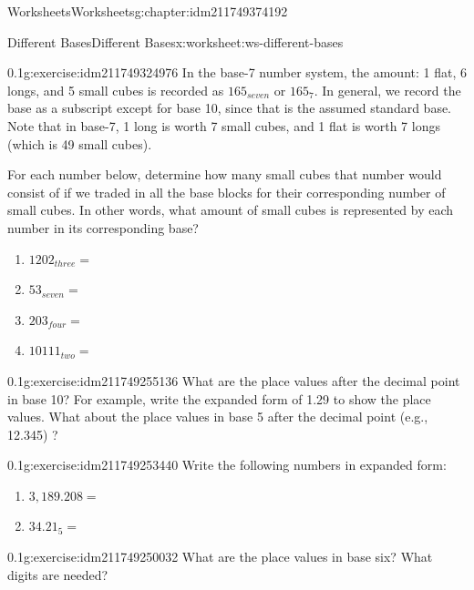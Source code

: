 \documentclass[twoside,11pt,]{book}
\begin{document}
\begin{chapterptx}{Worksheets}{}{Worksheets}{}{}{g:chapter:idm211749374192}
\restoregeometry
%
%
\typeout{************************************************}
\typeout{************************************************}
%
\begin{worksheet-section-numberless}{Different Bases}{}{Different Bases}{}{}{x:worksheet:ws-different-bases}
\begin{divisionexercise}{1}{}{0.1}{g:exercise:idm211749324976}%
In the base-7 number system, the amount: 1 flat, 6 longs, and 5 small cubes is recorded as \(165_{seven}\) or \(165_7\). In general, we record the base as a subscript except for base 10, since that is the assumed standard base.  Note that in base-7, 1 long is worth 7 small cubes, and 1 flat is worth 7 longs (which is 49 small cubes).%
\par
For each number below, determine how many small cubes that number would consist of if we traded in all the base blocks for their corresponding number of small cubes.  In other words, what amount of small cubes is represented by each number in its corresponding base?%
%
\begin{enumerate}[label=(\alph*)]
\item{}\(1202_{three}   = \)%
\item{}\(53_{seven}       = \)%
\item{}\(203_{four}       = \)%
\item{}\(10111_{two}       = \)%
\end{enumerate}
\end{divisionexercise}%
\begin{divisionexercise}{2}{}{0.1}{g:exercise:idm211749255136}%
What are the place values after the decimal point in base 10? For example, write the expanded form of 1.29 to show the place values. What about the place values in base 5 after the decimal point (e.g., 12.345) ?%
\end{divisionexercise}%
\begin{divisionexercise}{3}{}{0.1}{g:exercise:idm211749253440}%
Write the following numbers in expanded form:%
%
\begin{enumerate}[label=(\alph*)]
\item{}\(3,189.208 = \)%
\item{}\(34.21_5      = \)%
\end{enumerate}
\end{divisionexercise}%
\begin{divisionexercise}{4}{}{0.1}{g:exercise:idm211749250032}%
What are the place values in base six?  What digits are needed?%

\end{divisionexercise}
\end{worksheet-section-numberless}
\end{chapterptx}
\end{document}
